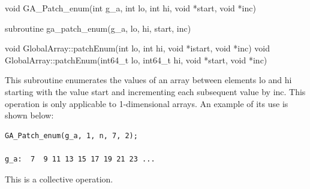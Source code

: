 \documentclass[12pt]{article}
\begin{document}

\begin{capi}
\begin{ccode}
void GA_Patch_enum(int g_a, int lo, int hi, void *start, void *inc)
\end{ccode}
\begin{funcargs}
\end{funcargs}
\end{capi}

\begin{fapi}
\begin{fcode}
subroutine ga_patch_enum(g_a, lo, hi, start, inc)
\end{fcode}
\begin{funcargs}
\end{funcargs}
\end{fapi}

\begin{cxxapi}
\begin{cxxcode}
void GlobalArray::patchEnum(int lo, int hi, void *istart, void *inc)
void GlobalArray::patchEnum(int64_t lo, int64_t hi, void *start, void *inc)
\end{cxxcode}
\begin{funcargs}
\end{funcargs}
\end{cxxapi}

\begin{desc}

This subroutine enumerates the values of an array between elements lo and hi starting with the value start and incrementing each subsequent value by inc. This operation is only applicable to 1-dimensional arrays. An example of its use is shown below:

\begin{verbatim}
GA_Patch_enum(g_a, 1, n, 7, 2);

g_a:  7  9 11 13 15 17 19 21 23 ...
\end{verbatim}

This is a collective operation.
\end{desc}
\end{document}
